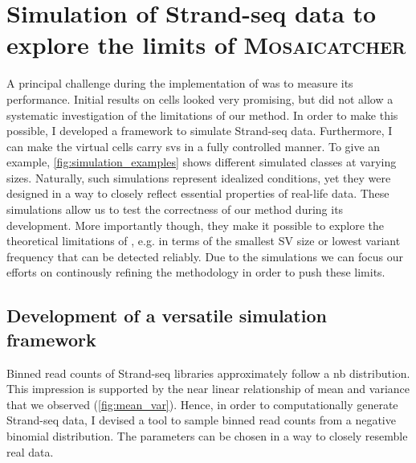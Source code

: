 \FloatBarrier
\section{Simulation of Strand-seq data to explore the limits of \textsc{Mosaicatcher}}
\label{sec:mosaic_simul}

A principal challenge during the implementation of \mc was to measure its
performance. Initial results on \rpe cells looked very promising, but did not
allow a systematic investigation of the limitations of our method. In order to
make this possible, I developed a framework to simulate Strand-seq data.
Furthermore, I can make the virtual cells carry \acp{sv} in a fully
controlled manner. To give an example, \cref{fig:simulation_examples} shows
different simulated \sv classes at varying sizes. Naturally, such simulations
represent idealized conditions, yet they were designed in a way to closely
reflect essential properties of real-life data.
These simulations allow us to test the correctness of our method during its
development. More importantly though, they make it possible to explore the
theoretical limitations of \mc, e.g. in terms of the smallest SV size or lowest
variant frequency that can be detected reliably. Due to the
simulations we can focus our efforts on continously refining the methodology in
order to push these limits.





\subsection{Development of a versatile simulation framework}
\label{sec:mosaic_simul_framework}

Binned read counts of Strand-seq libraries approximately follow a \acl{nb}
distribution. This impression is supported by the near linear relationship of
mean and variance that we observed (\cref{fig:mean_var}). Hence, in order to
computationally generate Strand-seq data, I devised a tool to sample binned read
counts from a negative binomial distribution. The \nb parameters can be chosen
in a way to closely resemble real data.

